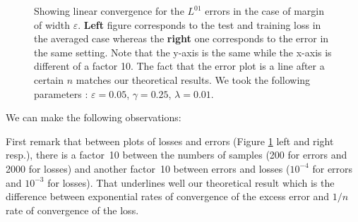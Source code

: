 \begin{figure}[ht]
\footnotesize
{}%
\hspace{1cm}%
%
\vspace{-0.5cm}
\caption{ \small Showing linear convergence for the $L^{01}$ errors in the case of margin of width $\varepsilon$. {\bfseries Left} figure corresponds to the test and training loss in the averaged case whereas the {\bfseries right} one corresponds to the error in the same setting. Note that the y-axis is the same while the x-axis is different of a factor 10. The fact that the error plot is a line after a certain $n$ matches our theoretical results. We took the following parameters :  $\varepsilon = 0.05$, $\gamma = 0.25$, $\lambda = 0.01$.}
\label{fig:plots}
\end{figure}
%
We can make the following observations:

First remark that between plots of losses and errors (Figure \ref{fig:plots} left and right resp.), there is a factor~10 between the numbers of samples (200 for errors and 2000 for losses) and another factor~10 between errors and losses ($10^{-4}$ for errors and $10^{-3}$ for losses). That underlines well our theoretical result which is the difference between exponential rates of convergence of the excess error and $1/n$ rate of convergence of the loss.

